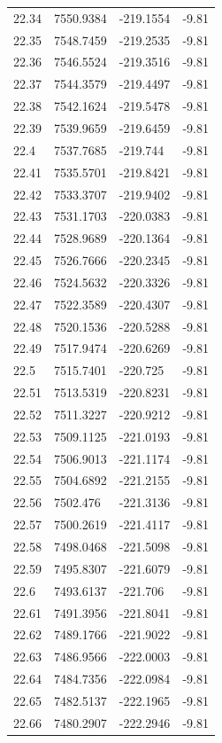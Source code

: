 \begin{table}[H]
\begin{tabular}{llll}
22.34 & 7550.9384 & -219.1554 & -9.81 \\
22.35 & 7548.7459 & -219.2535 & -9.81 \\
22.36 & 7546.5524 & -219.3516 & -9.81 \\
22.37 & 7544.3579 & -219.4497 & -9.81 \\
22.38 & 7542.1624 & -219.5478 & -9.81 \\
22.39 & 7539.9659 & -219.6459 & -9.81 \\
22.4 & 7537.7685 & -219.744 & -9.81 \\
22.41 & 7535.5701 & -219.8421 & -9.81 \\
22.42 & 7533.3707 & -219.9402 & -9.81 \\
22.43 & 7531.1703 & -220.0383 & -9.81 \\
22.44 & 7528.9689 & -220.1364 & -9.81 \\
22.45 & 7526.7666 & -220.2345 & -9.81 \\
22.46 & 7524.5632 & -220.3326 & -9.81 \\
22.47 & 7522.3589 & -220.4307 & -9.81 \\
22.48 & 7520.1536 & -220.5288 & -9.81 \\
22.49 & 7517.9474 & -220.6269 & -9.81 \\
22.5 & 7515.7401 & -220.725 & -9.81 \\
22.51 & 7513.5319 & -220.8231 & -9.81 \\
22.52 & 7511.3227 & -220.9212 & -9.81 \\
22.53 & 7509.1125 & -221.0193 & -9.81 \\
22.54 & 7506.9013 & -221.1174 & -9.81 \\
22.55 & 7504.6892 & -221.2155 & -9.81 \\
22.56 & 7502.476 & -221.3136 & -9.81 \\
22.57 & 7500.2619 & -221.4117 & -9.81 \\
22.58 & 7498.0468 & -221.5098 & -9.81 \\
22.59 & 7495.8307 & -221.6079 & -9.81 \\
22.6 & 7493.6137 & -221.706 & -9.81 \\
22.61 & 7491.3956 & -221.8041 & -9.81 \\
22.62 & 7489.1766 & -221.9022 & -9.81 \\
22.63 & 7486.9566 & -222.0003 & -9.81 \\
22.64 & 7484.7356 & -222.0984 & -9.81 \\
22.65 & 7482.5137 & -222.1965 & -9.81 \\
22.66 & 7480.2907 & -222.2946 & -9.81 \\

\end{tabular}
\end{table}
